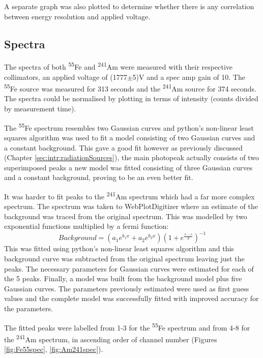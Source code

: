A separate graph was also plotted to determine whether there is any correlation between energy resolution and applied voltage.

\subsection{Spectra} \label{sec:mthd:spectra}

The spectra of both \textsuperscript{55}Fe and \textsuperscript{241}Am were measured with their respective collimators, an applied voltage of (1777$\pm$5)V and a spec amp gain of 10. The \textsuperscript{55}Fe source was measured for 313 seconds and the \textsuperscript{241}Am source for 374 seconds. The spectra could be normalised by plotting in terms of intensity (counts divided by measurement time).

The \textsuperscript{55}Fe spectrum resembles two Gaussian curves and python's non-linear least squares algorithm was used to fit a model consisting of two Gaussian curves and a constant background. This gave a good fit however as previously discussed (Chapter \ref{sec:intr:radiationSources}), the main photopeak actually consists of two superimposed peaks a new model was fitted consisting of three Gaussian curves and a constant background, proving to be an even better fit.

It was harder to fit peaks to the \textsuperscript{241}Am spectrum which had a far more complex spectrum. The spectrum was taken to WebPlotDigitizer where an estimate of the background was traced from the original spectrum. This was modelled by two exponential functions multiplied by a fermi function:
\begin{equation}
    Background = (a_{1}e^{b_{1}x}+a_{2}e^{b_{2}x})(1+e^{\frac{x-c}{d}})^{-1}
\end{equation}
This was fitted using python's non-linear least squares algorithm and this background curve was subtracted from the original spectrum leaving just the peaks. The necessary parameters for Gaussian curves were estimated for each of the 5 peaks. Finally, a model was built from the background model plus five Gaussian curves. The parameters previously estimated were used as first guess values and the complete model was successfully fitted with improved accuracy for the parameters.

The fitted peaks were labelled from 1-3 for the \textsuperscript{55}Fe spectrum and from 4-8 for the \textsuperscript{241}Am spectrum, in ascending order of 
channel number (Figures \ref{fig:Fe55spec}, \ref{fig:Am241spec}).

